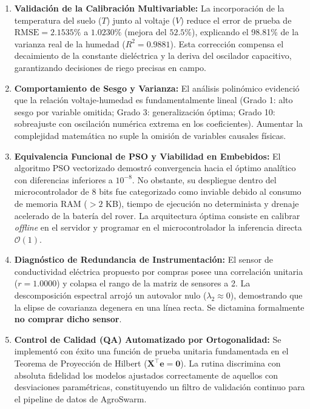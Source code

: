 \documentclass[12pt,a4paper]{article}
\begin{document}
\begin{enumerate}[leftmargin=20pt, label={\color{p3blue}\textbf{\arabic*.}}]
  \item \textbf{Validación de la Calibración Multivariable:} La incorporación de la temperatura del suelo ($T$) junto al voltaje ($V$) reduce el error de prueba de $\text{RMSE} = 2.1535\%$ a $\mathbf{1.0230\%}$ (mejora del $52.5\%$), explicando el 98.81\% de la varianza real de la humedad ($R^2 = 0.9881$). Esta corrección compensa el decaimiento de la constante dieléctrica y la deriva del oscilador capacitivo, garantizando decisiones de riego precisas en campo.
  \item \textbf{Comportamiento de Sesgo y Varianza:} El análisis polinómico evidenció que la relación voltaje-humedad es fundamentalmente lineal (Grado 1: alto sesgo por variable omitida; Grado 3: generalización óptima; Grado 10: sobreajuste con oscilación numérica extrema en los coeficientes). Aumentar la complejidad matemática no suple la omisión de variables causales físicas.
  \item \textbf{Equivalencia Funcional de PSO y Viabilidad en Embebidos:} El algoritmo PSO vectorizado demostró convergencia hacia el óptimo analítico con diferencias inferiores a $10^{-8}$. No obstante, su despliegue dentro del microcontrolador de 8 bits fue categorizado como inviable debido al consumo de memoria RAM ($> 2$ KB), tiempo de ejecución no determinista y drenaje acelerado de la batería del rover. La arquitectura óptima consiste en calibrar \textit{offline} en el servidor y programar en el microcontrolador la inferencia directa $\mathcal{O}(1)$.
  \item \textbf{Diagnóstico de Redundancia de Instrumentación:} El sensor de conductividad eléctrica propuesto por compras posee una correlación unitaria ($r = 1.0000$) y colapsa el rango de la matriz de sensores a 2. La descomposición espectral arrojó un autovalor nulo ($\lambda_2 \approx 0$), demostrando que la elipse de covarianza degenera en una línea recta. Se dictamina formalmente \textbf{no comprar dicho sensor}.
  \item \textbf{Control de Calidad (QA) Automatizado por Ortogonalidad:} Se implementó con éxito una función de prueba unitaria fundamentada en el Teorema de Proyección de Hilbert ($\mathbf{X}^\top \mathbf{e} = \mathbf{0}$). La rutina discrimina con absoluta fidelidad los modelos ajustados correctamente de aquellos con desviaciones paramétricas, constituyendo un filtro de validación continuo para el pipeline de datos de AgroSwarm.
\end{enumerate}
\end{document}
